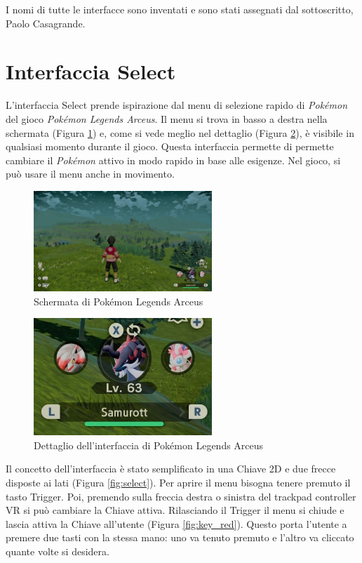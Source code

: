 \documentclass[target=bach,aauheader=]{thud}
\begin{document}
I nomi di tutte le interfacce sono inventati e sono stati assegnati dal sottoscritto, Paolo Casagrande.

\section{Interfaccia Select} %
\label{select}
L'interfaccia Select prende ispirazione dal menu di selezione rapido di \textit{Pokémon} del gioco \textit{Pokémon Legends Arceus}. 
Il menu si trova in basso a destra nella schermata (Figura \ref{fig:pok1}) e, come si vede meglio nel dettaglio (Figura \ref{fig:pok2}), è visibile in qualsiasi momento durante il gioco.
Questa interfaccia permette di permette cambiare il \textit{Pokémon} attivo in modo rapido in base alle esigenze. 
Nel gioco, si può usare il menu anche in movimento.

\begin{figure}[h]
    \centering
    \includegraphics[width=0.60\textwidth]{pok1}
    \caption{Schermata di Pokémon Legends Arceus}
    \label{fig:pok1}
\end{figure}

\begin{figure}[h]
    \centering
    \includegraphics[width=0.60\textwidth]{pok2}
    \caption{Dettaglio dell'interfaccia di Pokémon Legends Arceus}
    \label{fig:pok2}
\end{figure}

Il concetto dell'interfaccia è stato semplificato in una Chiave 2D e due frecce disposte ai lati (Figura \ref{fig:select}).
Per aprire il menu bisogna tenere premuto il tasto Trigger.
Poi, premendo sulla freccia destra o sinistra del trackpad controller VR si può cambiare la Chiave attiva.
Rilasciando il Trigger il menu si chiude e lascia attiva la Chiave all'utente (Figura \ref{fig:key_red}).
Questo porta l'utente a premere due tasti con la stessa mano: uno va tenuto premuto e l'altro va cliccato quante volte si desidera. \\
\end{document}
